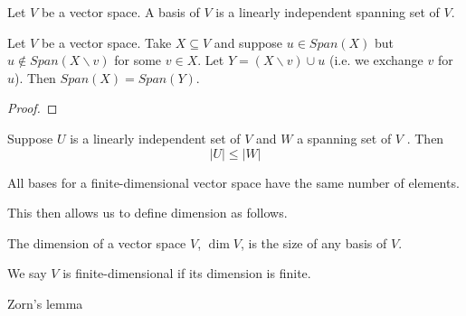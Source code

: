 \documentclass[11pt]{article}
\begin{document}
\begin{definition}[Basis]
  Let \(V\) be a vector space. A basis of \(V\) is a linearly independent spanning set of \(V\).
\end{definition}

\begin{theorem}
  Let \(V\) be a vector space. Take \(X\subseteq V\) and suppose \(u \in Span(X)\) but \(u \notin Span(X\backslash{v})\) for some \(v\in X\). Let \(Y = (X \backslash {v}) \cup {u}\) (i.e. we exchange \(v\) for \(u\)). Then \(Span(X) = Span(Y)\).
\end{theorem}
\begin{proof}
\end{proof}
\begin{theorem}
  Suppose \(U\) is a linearly independent set of \(V\) and \(W\) a spanning set of \(V\) . Then 
  \[|U|\leq |W|\]
\end{theorem}
\begin{corollary}
  All bases for a finite-dimensional vector space have the same number of elements.
\end{corollary}

This then allows us to define dimension as follows.
\begin{definition}[Dimension]
  The dimension of a vector space \(V\), \(\dim V\), is the size of any basis of \(V\). 

  We say \(V\) is finite-dimensional if its dimension is finite.
\end{definition}

\begin{extension}{Zorn's lemma}
  
\end{extension}
\end{document}
